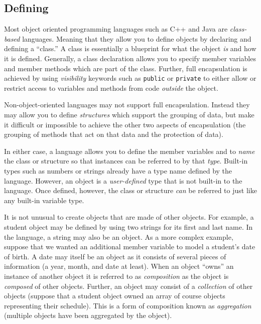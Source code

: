 \subsection{Defining}

Most object oriented programming languages such as C++ and Java are 
\emph{class-based} languages.  Meaning that they allow you to define
objects by declaring and defining a  ``class.''  A class is essentially
a blueprint for what the object \emph{is} and how it is defined.  
Generally, a class declaration allows you to specify 
member variables
and  member methods which are part of the class.  
Further, full encapsulation is achieved by using
\emph{visibility} keywords such as \texttt{public} or
\texttt{private} to either allow or restrict access to variables
and methods from code \emph{outside} the object.  

Non-object-oriented languages may not support full encapsulation.  Instead
they may allow you to define \emph{structures} which support the grouping of data, 
but make it difficult or impossible to achieve the other two aspects of
encapsulation (the grouping of methods that act on that data and the
protection of data).

In either case, a language allows you to define the member variables
and to \emph{name} the class or structure so that instances can be referred
to by that \emph{type}.  Built-in types such as numbers or strings already
have a type name defined by the language.  However, an object is a 
\emph{user-defined} type that is not built-in to the language.  Once defined,
however, the class or structure \emph{can} be referred to just like any
built-in variable type.

It is not unusual to create objects that are made of other objects.  For
example, a student object may be defined by using two strings for its first
and last name.  In the language, a string may also be an object.  As a
more complex example, suppose that we wanted an additional member variable
to model a student's date of birth.  A date may itself be an object as it
consists of several pieces of information (a year, month, and date at least).
When an object ``owns'' an instance of another object it is referred to
as \emph{composition}  as the object is \emph{composed} of 
other objects.  Further, an object may consist of a \emph{collection}
of other objects (suppose that a student object owned an array of 
course objects representing their schedule).  This is a form of composition
known as  \emph{aggregation} (multiple objects have been aggregated
by the object).

